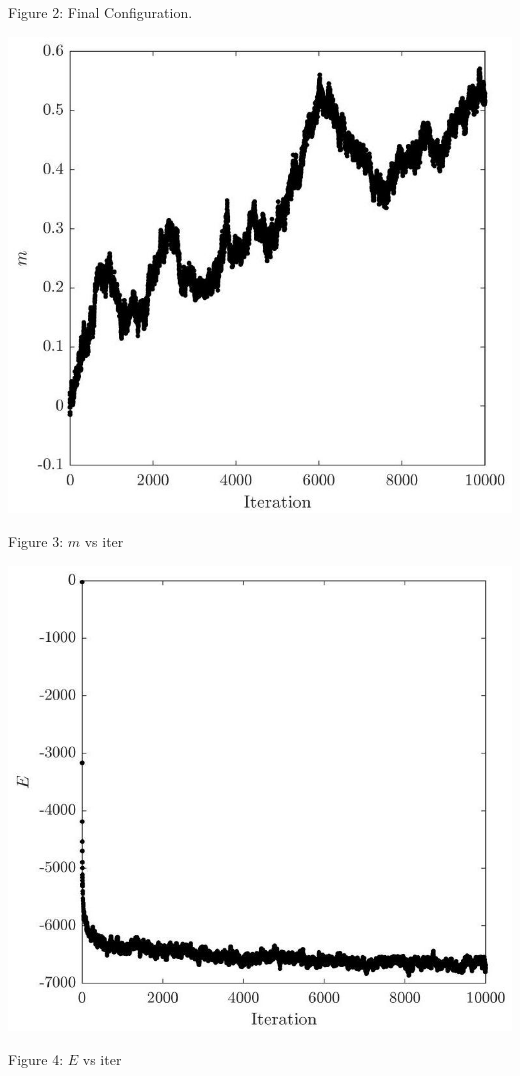 \documentclass[12pt]{article}
\begin{document}
Figure 2: Final Configuration.

\begin{center}
\includegraphics[max width=\textwidth]{2024_03_02_8c82830fbe70d4921a9fg-5(1)}
\end{center}

Figure 3: $m$ vs iter

\begin{center}
\includegraphics[max width=\textwidth]{2024_03_02_8c82830fbe70d4921a9fg-5}
\end{center}

Figure 4: $E$ vs iter
\end{document}
